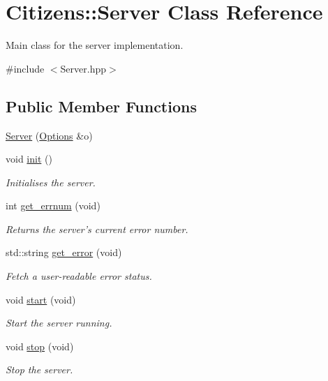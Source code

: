 \hypertarget{classCitizens_1_1Server}{
\section{Citizens::Server Class Reference}
\label{classCitizens_1_1Server}
}


Main class for the server implementation.  




{\ttfamily \#include $<$Server.hpp$>$}

\subsection*{Public Member Functions}
\begin{DoxyCompactItemize}
\item 
\hyperlink{classCitizens_1_1Server_ab8690671ca68dce60eaa48f8089de0f2}{Server} (\hyperlink{classCitizens_1_1Options}{Options} \&o)
\item 
void \hyperlink{classCitizens_1_1Server_a1016678b77eacc5aa97f2310f8b442b1}{init} ()
\begin{DoxyCompactList}\small\item\em Initialises the server. \end{DoxyCompactList}\item 
int \hyperlink{classCitizens_1_1Server_a66bff30ae002017817b3f9fde246f32f}{get\_\-errnum} (void)
\begin{DoxyCompactList}\small\item\em Returns the server's current error number. \end{DoxyCompactList}\item 
std::string \hyperlink{classCitizens_1_1Server_adb4082d18591d6c6e7b9ad46264300a9}{get\_\-error} (void)
\begin{DoxyCompactList}\small\item\em Fetch a user-\/readable error status. \end{DoxyCompactList}\item 
void \hyperlink{classCitizens_1_1Server_a6c49e51b28feb60984a796a86a628c0f}{start} (void)
\begin{DoxyCompactList}\small\item\em Start the server running. \end{DoxyCompactList}\item 
void \hyperlink{classCitizens_1_1Server_aa7894921e759f2a7bb4c51b306b0bb47}{stop} (void)
\begin{DoxyCompactList}\small\item\em Stop the server. \end{DoxyCompactList}\item 

\end{DoxyCompactItemize}
